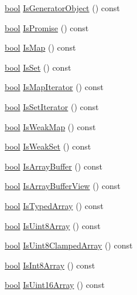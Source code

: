 \begin{DoxyCompactItemize}
\item 
\mbox{\hyperlink{classbool}{bool}} \mbox{\hyperlink{classv8_1_1Value_af6f2d3199fe8b5eee219ef42574293ac}{Is\+Generator\+Object}} () const
\item 
\mbox{\hyperlink{classbool}{bool}} \mbox{\hyperlink{classv8_1_1Value_a4b0be5d9dc3a857fee9ba7dac07123e3}{Is\+Promise}} () const
\item 
\mbox{\hyperlink{classbool}{bool}} \mbox{\hyperlink{classv8_1_1Value_a85e4e8455cbd60c9b0a1dc91030383e6}{Is\+Map}} () const
\item 
\mbox{\hyperlink{classbool}{bool}} \mbox{\hyperlink{classv8_1_1Value_a131fc14572f31efd8e2969963564abbb}{Is\+Set}} () const
\item 
\mbox{\hyperlink{classbool}{bool}} \mbox{\hyperlink{classv8_1_1Value_a761b2fd0aa8c2f59c879741336eb2f66}{Is\+Map\+Iterator}} () const
\item 
\mbox{\hyperlink{classbool}{bool}} \mbox{\hyperlink{classv8_1_1Value_a908403b5e09eb5dc0087b562b01618a4}{Is\+Set\+Iterator}} () const
\item 
\mbox{\hyperlink{classbool}{bool}} \mbox{\hyperlink{classv8_1_1Value_a3be1c8f103d9aa9b31b3b1c56905337d}{Is\+Weak\+Map}} () const
\item 
\mbox{\hyperlink{classbool}{bool}} \mbox{\hyperlink{classv8_1_1Value_a66c2dbb0ed13325f0f9e6b38e5e1992c}{Is\+Weak\+Set}} () const
\item 
\mbox{\hyperlink{classbool}{bool}} \mbox{\hyperlink{classv8_1_1Value_a62c732277023d09f5e5a54eaa2846853}{Is\+Array\+Buffer}} () const
\item 
\mbox{\hyperlink{classbool}{bool}} \mbox{\hyperlink{classv8_1_1Value_ab1ba4b263da3630cf8efd0c6b6e26293}{Is\+Array\+Buffer\+View}} () const
\item 
\mbox{\hyperlink{classbool}{bool}} \mbox{\hyperlink{classv8_1_1Value_a01183cf30ba5e6383cdca82daee630d8}{Is\+Typed\+Array}} () const
\item 
\mbox{\hyperlink{classbool}{bool}} \mbox{\hyperlink{classv8_1_1Value_af11d828f1a78df0de696e210571b7860}{Is\+Uint8\+Array}} () const
\item 
\mbox{\hyperlink{classbool}{bool}} \mbox{\hyperlink{classv8_1_1Value_a655a46fa71c8a33d138756d8a6c515ac}{Is\+Uint8\+Clamped\+Array}} () const
\item 
\mbox{\hyperlink{classbool}{bool}} \mbox{\hyperlink{classv8_1_1Value_ad9c2858387a0cafe3628f0533a9bbf6a}{Is\+Int8\+Array}} () const
\item 
\mbox{\hyperlink{classbool}{bool}} \mbox{\hyperlink{classv8_1_1Value_af3e8da420ddc0f92aac5dbfe61ac9699}{Is\+Uint16\+Array}} () const

\end{DoxyCompactItemize}
